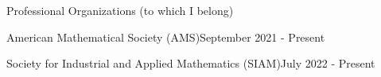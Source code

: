 \begin{rSection}{Professional Organizations (to which I belong)}

\begin{rSubsectionSmall}{American Mathematical Society (AMS)}{September 2021 - Present}
\end{rSubsectionSmall}

\smallskip

\begin{rSubsectionSmall}{Society for Industrial and Applied Mathematics (SIAM)}{July 2022 - Present}
\end{rSubsectionSmall}

\end{rSection}